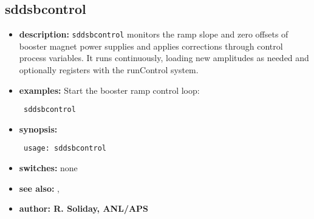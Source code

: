 %
%
\begin{latexonly}
\newpage
\end{latexonly}

\subsection{sddsbcontrol}
\label{sddsbcontrol}

\begin{itemize}
\item {\bf description:}
\verb+sddsbcontrol+ monitors the ramp slope and zero offsets of booster magnet power supplies and applies corrections through control process variables. It runs continuously, loading new amplitudes as needed and optionally registers with the runControl system.

\item {\bf examples:}
Start the booster ramp control loop:
\begin{flushleft}{\tt
sddsbcontrol\\
}\end{flushleft}

\item {\bf synopsis:}
\begin{flushleft}{\tt
usage: sddsbcontrol\\
}\end{flushleft}

\item {\bf switches:} none

\item {\bf see also:} , 

\item {\bf author: R. Soliday, ANL/APS}
\end{itemize}
